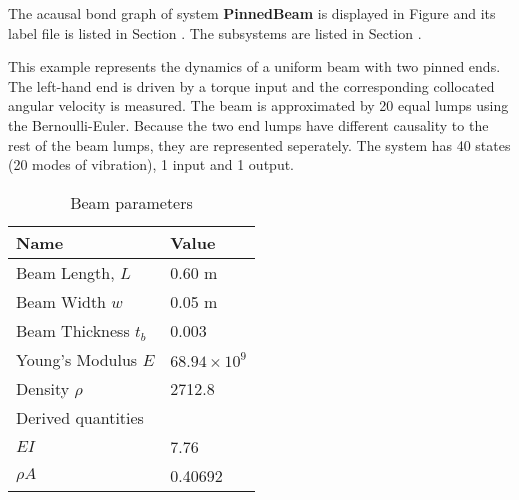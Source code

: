 

The acausal bond graph of system \textbf{PinnedBeam} is displayed in
Figure  and its label file is listed in
Section .  The subsystems are listed in Section
.
   
This example represents the dynamics of a uniform beam with two pinned
ends. The left-hand end is driven by a torque input and the
corresponding collocated angular velocity is measured.  The beam is
approximated by 20 equal lumps using the Bernoulli-Euler.  Because the
two end lumps have different causality to the rest of the beam lumps,
they are represented seperately.  The system has 40 states (20 modes
of vibration), 1 input and 1 output.

\begin{table}[htbp]
  \begin{center}
    \begin{tabular}{|l|l|}
      \hline
      Name & Value\\
      \hline
      Beam Length, $L$       & 0.60 m\\
      Beam Width $w$             & 0.05 m\\
      Beam Thickness $t_b$   & 0.003\\
      Young's Modulus  $E$       & $68.94 \times 10^9$ \\
      Density          $\rho$    & 2712.8\\
      \hline
      Derived quantities & \\
      \hline
      $EI$                     & 7.76\\
      $\rho A$   & 0.40692 \\
      \hline
    \end{tabular}
    \caption{Beam parameters}
    \label{tab:beam}
  \end{center}
\end{table}


